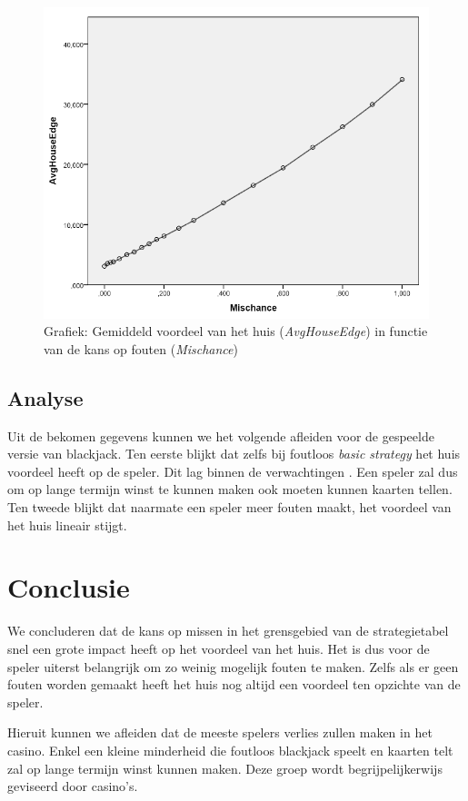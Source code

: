 \documentclass[conference]{IEEEtran}
\begin{document}
\begin{figure}[H]
	\includegraphics[width=\linewidth]{img/grafiek.jpg}
  	\caption{Grafiek: Gemiddeld voordeel van het huis (\textit{AvgHouseEdge}) in functie van de kans op fouten (\textit{Mischance})}
  	\label{fig:HouseEdgeMissen}
\end{figure}


\subsection{Analyse}
Uit de bekomen gegevens kunnen we het volgende afleiden voor de gespeelde versie van blackjack. Ten eerste blijkt dat zelfs bij foutloos \textit{basic strategy} het huis voordeel heeft op de speler. Dit lag binnen de verwachtingen \cite{fogel2004evolving}. Een speler zal dus om op lange termijn winst te kunnen maken ook moeten kunnen kaarten tellen. Ten tweede blijkt dat naarmate een speler meer fouten maakt, het voordeel van het huis lineair stijgt.

\section{Conclusie}
We concluderen dat de kans op missen in het grensgebied van de strategietabel snel een grote impact heeft op het voordeel van het huis. Het is dus voor de speler uiterst belangrijk om zo weinig mogelijk fouten te maken. Zelfs als er geen fouten worden gemaakt heeft het huis nog altijd een voordeel ten opzichte van de speler.

Hieruit kunnen we afleiden dat de meeste spelers verlies zullen maken in het casino. Enkel een kleine minderheid die foutloos blackjack speelt en kaarten telt zal op lange termijn winst kunnen maken. Deze groep wordt begrijpelijkerwijs geviseerd door casino's.
\end{document}
